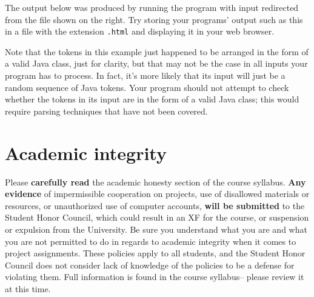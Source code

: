 \documentclass[11pt]{article}
\begin{document}
    {

      \setlength{\columnsep}{-70mm}

      \begin{multicols}{2}

        \noindent
        The output below was produced by running the program with input
      redirected from the file shown on the right.  Try storing your
      programs' output such as this in a file with the extension
      \texttt{.html} and displaying it in your web browser.

        Note that the tokens in this example just happened to be arranged in
      the form of a valid Java class, just for clarity, but that may not be
      the case in all inputs your program has to process.  In fact, it's
      more likely that its input will just be a random sequence of Java
      tokens.  Your program should not attempt to check whether the tokens
      in its input are in the form of a valid Java class; this would require
      parsing techniques that have not been covered.

      \columnbreak

      \hspace{\fill}
      \begin{minipage}[t]{1.85in}


      \end{minipage}

    \end{multicols}

    }

    \vspace{-2mm}

    \begin{minipage}[t]{7.2in}


    \end{minipage}

    \medskip\smallskip

  \section{Academic integrity}

    Please \textbf{carefully read} the academic honesty section of the course
  syllabus.  \textbf{Any evidence} of impermissible cooperation on projects,
  use of disallowed materials or resources, or unauthorized use of computer
  accounts, \textbf{will be submitted} to the Student Honor Council, which
  could result in an XF for the course, or suspension or expulsion from the
  University.  Be sure you understand what you are and what you are not
  permitted to do in regards to academic integrity when it comes to project
  assignments.  These policies apply to all students, and the Student Honor
  Council does not consider lack of knowledge of the policies to be a
  defense for violating them.  Full information is found in the course
  syllabus-- please review it at this time.
\end{document}
